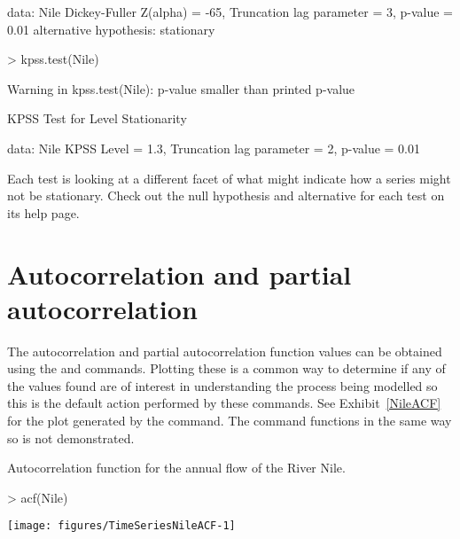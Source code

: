 \begin{Schunk}
\begin{Soutput}
data:  Nile
Dickey-Fuller Z(alpha) = -65, Truncation lag
parameter = 3, p-value = 0.01
alternative hypothesis: stationary
\end{Soutput}
\begin{Sinput}
> kpss.test(Nile)
\end{Sinput}
\begin{Soutput}
Warning in kpss.test(Nile): p-value smaller than printed p-value
\end{Soutput}
\begin{Soutput}

	KPSS Test for Level Stationarity

data:  Nile
KPSS Level = 1.3, Truncation lag parameter = 2,
p-value = 0.01
\end{Soutput}
\end{Schunk}
Each test is looking at a different facet of what might indicate how a series might not be stationary. Check out the null hypothesis and alternative for each test on its help page.



\section{Autocorrelation and partial autocorrelation}


The autocorrelation and partial autocorrelation function values can be obtained using the  and  commands. Plotting these is a common way to determine if any of the values found are of interest in understanding the process being modelled so this is the default action performed by these commands. See Exhibit~\ref{NileACF} for the plot generated by the  command. The  command functions in the same way so is not demonstrated.
\begin{exhibit}
\begin{center}
\caption{Autocorrelation function for the annual flow of the River Nile.}
\label{NileACF}
\begin{Schunk}
\begin{Sinput}
> acf(Nile)
\end{Sinput}

\texttt{[image: figures/TimeSeriesNileACF-1]} \end{Schunk}
\end{center}
\end{exhibit}

